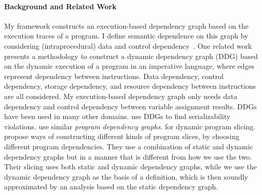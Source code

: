
 \paragraph*{Background and Related Work}
 {
My framework constructs an execution-based dependency graph based on the execution traces of a program. I define semantic dependence on this graph by considering (intraprocedural) data and control dependency~\cite{bilardi1996framework,cytron1991efficiently,pollock1989incremental}. 
One related work 
\cite{austin1992dynamic} presents a methodology to construct a dynamic dependency graph (DDG) based on the dynamic execution of a program in an imperative language, 
where edges represent dependency between instructions. Data dependency, control dependency, storage dependency, and resource dependency between instructions are all considered. My execution-based dependency graph only needs data dependency and control dependency between variable assignment results. 
%
DDGs have been used in many other domains. \cite{nagar2018automated} use DDGs to find serializability violations. \cite{hammer2006dynamic} use similar \emph{program dependency graphs}. 
\cite{ferrante1987program} for dynamic program slicing.
\cite{mastroeni2008data} propose ways of constructing different kinds of program slices, by choosing different program dependencies. 
They use a combination of 
static and dynamic dependency graphs but in a manner that is different from how we use the two. Their slicing uses both static and dynamic dependency graphs, while we use the dynamic dependency graph as the basis of a definition, which is then soundly approximated by an analysis based on the static dependency graph.}

